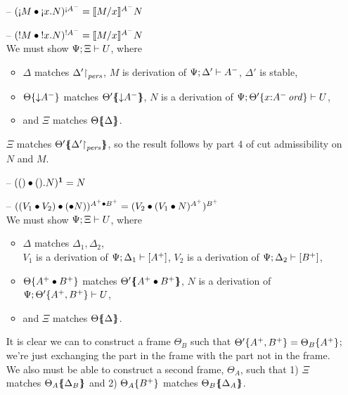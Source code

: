 \begin{itemize}
\item[--] $(\subst{\tgnabr{M}}{\tgnabl{x}{N}})^{{\scriptgnab}A^-}
           = \rsubsta{M}{x}{N}{A^-}$

\item[--] $(\subst{\tbangr{M}}{\tbangl{x}{N}})^{{!}A^-}
           = \rsubsta{M}{x}{N}{A^-}$ \smallskip\\
  We must show $\foc{\Psi}{\Xi}{U}$, where
  \begin{itemize}
  \item $\Delta$ matches $\restrictto{\Delta'}{\mpers}$,
        $M$ is derivation of $\foc{\Psi}{\Delta'}{A^-}$, 
        $\Delta'$ is stable,
  \item $\tackon{\Theta}{{\downarrow}A^-}$ matches 
        $\frameoff{\Theta'}{{\downarrow}A^-}$,
        $N$ is a derivation of 
        $\foc{\Psi}{\tackon{\Theta'}{x{:}\istrue{A^-}}}{U}$,
  \item and $\Xi$ matches $\frameoff{\Theta}{\Delta}$.
  \end{itemize}

  $\Xi$ matches $\frameoff{\Theta'}{\restrictto{\Delta'}{\mpers}}$,
  so the result follows by
  part 4 of cut admissibility on $N$ and $M$. 

\smallskip

\item[--] $(\subst{\toner}{\tonel{N}})^{\one} = N$

\item[--] $(\subst{(\tfuser{V_1}{V_2})}{(\tfusel{N}}))^{A^+ \fuse B^+}
           = (\subst{V_2}{(\subst{V_1}{N})^{A^+}})^{B^+}$ \smallskip\\
  We must show $\foc{\Psi}{\Xi}{U}$, where
  \begin{itemize}
  \item $\Delta$ matches $\Delta_1, \Delta_2$,\\
        $V_1$ is a derivation of $\foc{\Psi}{\Delta_1}{[A^+]}$,
        $V_2$ is a derivation of $\foc{\Psi}{\Delta_2}{[B^+]}$,
  \item $\tackon{\Theta}{A^+ \fuse B^+}$ matches
        $\frameoff{\Theta'}{A^+ \fuse B^+}$, 
        $N$ is a derivation of 
        $\foc{\Psi}{\tackon{\Theta'}{A^+, B^+}}{U}$, 
  \item and $\Xi$ matches $\frameoff{\Theta}{\Delta}$.
  \end{itemize}

  It is clear we can to construct a frame $\Theta_B$ such that
  $\tackon{\Theta'}{A^+, B^+} = \tackon{\Theta_B}{A^+}$; we're just exchanging
  the part in the frame with the part not in the frame. We also 
  must be able to construct a second frame, $\Theta_A$, such that
  1) $\Xi$ matches $\frameoff{\Theta_A}{\Delta_B}$ and 
  2) $\tackon{\Theta_A}{B^+}$ matches $\frameoff{\Theta_B}{\Delta_A}$.


\end{itemize}
